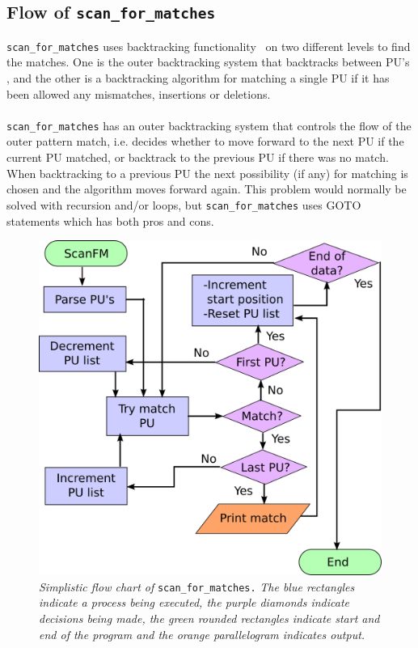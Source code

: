 \documentclass[12pt]{article}
\newcommand{\scm}{\texttt{scan\_for\_matches} }
\newcommand{\scmp}{\texttt{scan\_for\_matches.} }
\newcommand{\pu}{PU }
\newcommand{\pus}{PU's }
\begin{document}
\subsection{Flow of \scm}
\scm uses backtracking functionality~\cite{back} on two different levels to find the matches. 
One is the outer backtracking system that backtracks between \pus, and the other is a backtracking algorithm
for matching a single \pu if it has been allowed any mismatches, insertions or deletions. \\ \\
\scm has an outer backtracking system that controls the flow of the outer pattern match, i.e. decides whether to
move forward to the next \pu if the current \pu matched, or backtrack to the previous \pu if there was no match.
When backtracking to a previous \pu the next possibility (if any) for matching is chosen and the algorithm moves
forward again. This problem would normally be solved with recursion and/or loops, but \scm uses GOTO statements which has 
both pros and cons. \\
\begin{figure}[H]
\begin{center}
\includegraphics[scale=0.4]{Diagrams/ScanfmFlow.png}
\end{center}
\caption{\textit{Simplistic flow chart of} \scmp \textit{The blue rectangles indicate a process being executed, 
the purple diamonds indicate decisions being made, the green rounded rectangles indicate start and end of the program
and the orange parallelogram indicates output.}}
\end{figure}
\end{document}
